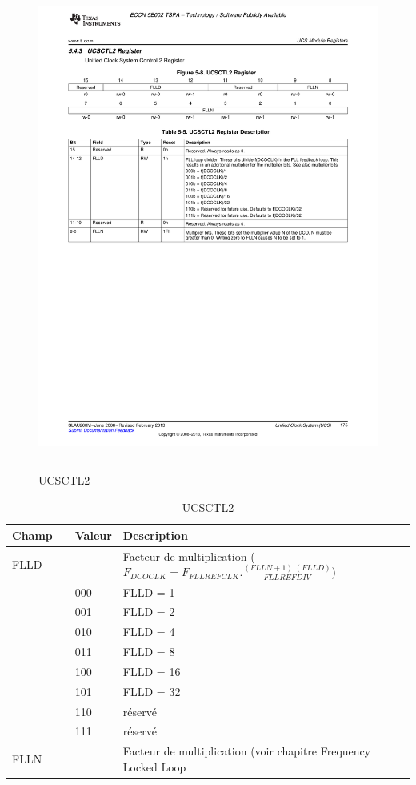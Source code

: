 \begin{figure}[H]
  \centering
  \includegraphics [angle=0, width=16cm]{./Figures/Chap6_Horloges/UCSCTL2.pdf}
  \rule{35em}{0.5pt}
  \caption{UCSCTL2}
  \label{fig:UCSCTL2}
\end{figure}

\begin{table}[H]
\centering 
\begin{tabular}{l l l l}
\hline\hline
Champ & & Valeur & Description \\ %
\hline
FLLD & & & Facteur de multiplication ($F_{DCOCLK}=F_{FLLREFCLK}.\frac{(FLLN+1).(FLLD)}{FLLREFDIV}$)  \\
& & 000 & FLLD = 1 \\
& & 001 & FLLD = 2 \\
& & 010 & FLLD = 4 \\
& & 011 & FLLD = 8 \\
& & 100 & FLLD = 16 \\
& & 101 & FLLD = 32 \\
& & 110 & réservé \\
& & 111 & réservé \\
\hline
FLLN & & & Facteur de multiplication (voir chapitre {Frequency Locked Loop} \\
\hline
\end{tabular}
\caption{UCSCTL2}
\label{table:UCSCTL2}
\end{table}

